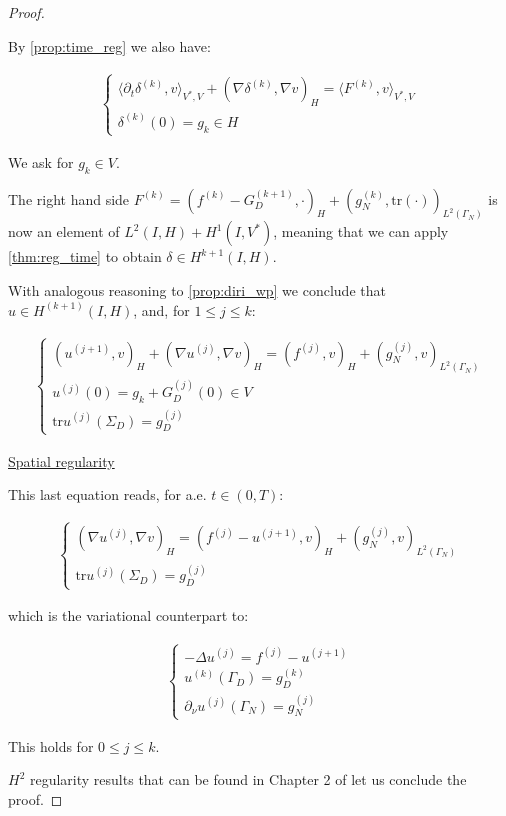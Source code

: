 \documentclass[english,a4paper,10pt,oneside]{scrbook}	%
\theoremstyle{break}
\newenvironment{mproof}[1][\proofname]{%
  \begin{proof}[#1]$ $\par\nobreak\ignorespaces
}{%
  \end{proof}
}
\renewcommand*{\proofname}{Proof}
\theoremstyle{remark}
\newcommand{\tr}{\text{tr}}
\begin{document}
\begin{mproof}
By \cref{prop:time_reg} we also have:

\begin{align*}
\left\{\begin{matrix}
\langle \partial_t \delta^{(k)},v\rangle_{V^*,V} + (\nabla \delta^{(k)}, \nabla v)_H = \langle F^{(k)}, v\rangle_{V^*,V} \\
\delta^{(k)}(0) = g_k \in H
\end{matrix}\right.
\end{align*}

We ask for $g_k \in V$.

The right hand side $F^{(k)} = (f^{(k)} - G^{(k+1)}_D, \cdot)_H +(g_N^{(k)}, \tr(\cdot))_{L^2(\Gamma_N)}$ is now an element of $L^2(I,H) + H^1(I,V^*)$, meaning that we can apply \ref{thm:reg_time} to obtain $\delta \in H^{k+1}(I,H)$. 

With analogous reasoning to \cref{prop:diri_wp} we conclude that $u \in H^{(k+1)}(I,H)$, and, for $1\leq j \leq k$:

\begin{align*}
	\left\{\begin{matrix}
(u^{(j+1)},v)_H + (\nabla u^{(j)}, \nabla v)_H = ( f^{(j)}, v)_H + (g_N^{(j)}, v)_{L^2(\Gamma_N)} \\
u^{(j)}(0) = g_k + G_D^{(j)}(0)  \in V \\
\tr u^{(j)}(\Sigma_D) = g_D^{(j)}
\end{matrix}\right.
\end{align*}

\underline{Spatial regularity}

This last equation reads, for a.e. $t \in (0,T)$:

\begin{align*}
\left\{\begin{matrix}
(\nabla u^{(j)}, \nabla v)_H = ( f^{(j)} - u^{(j+1)}, v)_H + (g_N^{(j)}, v)_{L^2(\Gamma_N)} \\
\tr u^{(j)}(\Sigma_D) = g_D^{(j)}
\end{matrix}\right.
\end{align*}

which is the variational counterpart to:

\begin{align*}
\left\{\begin{matrix}
- \Delta  u^{(j)} = f^{(j)} - u^{(j+1)} \\
u^{(k)}(\Gamma_D) = g_D^{(k)} \\
\partial_\nu u^{(j)}(\Gamma_N) = g_N^{(j)}
\end{matrix}\right.
\end{align*}

This holds for $0\leq j \leq k$.

$H^2$ regularity results that can be found in Chapter 2 of \cite{grisvard} let us conclude the proof.

\end{mproof}
\end{document}
